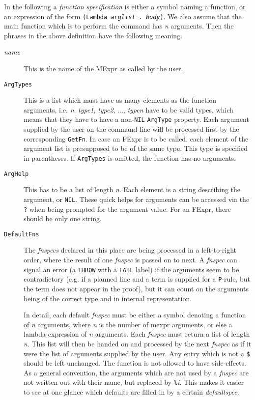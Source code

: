 In the following a {\it function specification} is either a symbol naming
a function, or an expression of the form {\tt (Lambda {\it arglist} . {\it body})}.
We also assume that the main function which is to perform the command has
{\it n} arguments.  Then the phrases in the above definition have the
following meaning.
\begin{description}
\item [{\it name}]
 This is the name of the MExpr as called by the user.

\item [{\tt ArgTypes}] This is a list which must have as many elements as the
function arguments, i.e. {\it n}.  {\it type1}, {\it type2}, ..., {\it typen} have
to be valid types, which means that they
have to have a non-{\tt NIL} {\tt ArgType} property.  Each argument supplied by the
user on the command line will be processed first by the corresponding
{\tt GetFn}.  In case an FExpr is to be called, each element of the
argument list is presupposed to be of the same type.  This type is
specified in parentheses.  If {\tt ArgTypes} is omitted, the function has
no arguments.

\item [{\tt ArgHelp}] This has to be a list of length {\it n}.  Each element is
a string describing the argument, or {\tt NIL}.  These quick helps
for arguments can be accessed via the {\tt ?} when being prompted
for the argument value.  For an FExpr, there should be only one string.

\item [{\tt DefaultFns}]
The {\it fnspecs} declared in this place are being processed in a
left-to-right order, where the result of one {\it fnspec} is passed on
to next.  A {\it fnspec} can signal an error (a {\tt THROW} with a
{\tt FAIL} label) if the arguments seem to be contradictory (e.g.  if a
planned line and a term is supplied for a {\tt P}-rule, but the term does
not appear in the proof), but it can count on the arguments being of
the correct type and in internal representation. 

In detail, each default {\it fnspec} must be either a symbol denoting
a function of {\it n} arguments, where {\it n} is the number of mexpr
arguments, or else a lambda expression of {\it n} arguments.
Each {\it fnspec} must return a list of
length {\it n}.  This list will then be handed on and processed by the next
{\it fnspec} as if it were the list of arguments supplied by the user.
Any entry which is not a {\tt \$} should be left unchanged.  The function
is not allowed to have side-effects.
As a general convention, the arguments which are not used by
a {\it fnspec} are not written out with their name, but replaced by
{\tt \%}{\it i}.  This makes it easier to see at one glance which defaults
are filled in by a certain {\it defaultspec}. 


\end{description}
